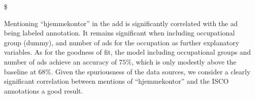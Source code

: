 \documentclass[11pt,]{article}
\begin{document}
\$

Mentioning ``hjemmekontor'' in the add is significantly correlated with
the ad being labeled annotation. It remains significant when including
occupational group (dummy), and number of ads for the occupation as
further explanatory variables. As for the goodness of fit, the model
including occupational groups and number of ads achieve an accuracy of
\(75\%\), which is only modestly above the baseline at \(68\%\). Given
the spuriousness of the data sources, we consider a clearly significant
correlation between mentions of ``hjemmekontor'' and the ISCO
annotations a good result.

\newpage
\singlespacing 

\end{document}
